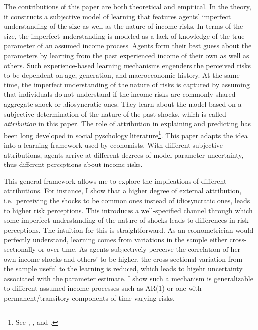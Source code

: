 \documentclass[12pt,notitlepage,onecolumn,aps,pra]{article}
\begin{document}
The contributions of this paper are both theoretical and empirical. In
the theory, it constructs a subjective model of learning that features
agents' imperfect understanding of the size as well as the nature of
income risks. In terms of the size, the imperfect understanding is
modeled as a lack of knowledge of the true parameter of an assumed
income process. Agents form their best guess about the parameters by
learning from the past experienced income of their own as well as
others. Such experience-based learning mechanisms engenders the
perceived risks to be dependent on age, generation, and macroeconomic
history. At the same time, the imperfect understanding of the nature of
risks is captured by assuming that individuals do not understand if the
income risks are commonly shared aggregate shock or idiosyncratic ones.
They learn about the model based on a subjective determination of the
nature of the past shocks, which is called \emph{attribution} in this
paper. The role of attribution in explaining and predicting has been
long developed in social pyschology
literature\footnote{See \cite{heider1958psychology}, \cite{kelley1967attribution}, and \cite{fiske1991social}.}.
This paper adapts the idea into a learning framework used by economists.
With different subjective attributions, agents arrive at different
degrees of model parameter uncertainty, thus different perceptions about
income risks.

This general framework allows me to explore the implications of
different attributions. For instance, I show that a higher degree of
external attribution, i.e.~perceiving the shocks to be common ones
instead of idiosyncratic ones, leads to higher risk perceptions. This
introduces a well-specified channel through which some imperfect
understanding of the nature of shocks leads to differences in risk
perceptions. The intuition for this is straightforward. As an
econometrician would perfectly understand, learning comes from
variations in the sample either cross-sectionally or over time. As
agents subjectively perceive the correlation of her own income shocks
and others' to be higher, the cross-sectional variation from the sample
useful to the learning is reduced, which leads to higehr uncertainty
associated with the parameter estimate. I show such a mechanism is
generalizable to different assumed income processes such as AR(1) or one
with permanent/transitory components of time-varying risks.
\end{document}
